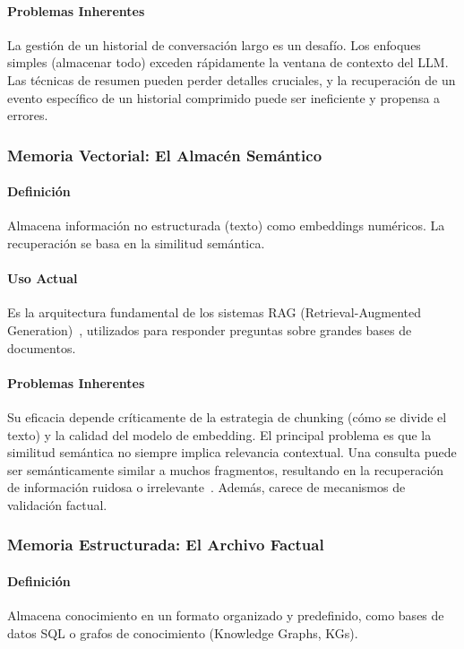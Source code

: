 \documentclass[journal,onecolumn]{IEEEtran}
\begin{document}
\paragraph{Problemas Inherentes} La gestión de un historial de conversación largo es un desafío. Los enfoques simples (almacenar todo) exceden rápidamente la ventana de contexto del LLM. Las técnicas de resumen pueden perder detalles cruciales, y la recuperación de un evento específico de un historial comprimido puede ser ineficiente y propensa a errores.

\subsubsection{Memoria Vectorial: El Almacén Semántico}
\paragraph{Definición} Almacena información no estructurada (texto) como embeddings numéricos. La recuperación se basa en la similitud semántica.

\paragraph{Uso Actual} Es la arquitectura fundamental de los sistemas RAG (Retrieval-Augmented Generation)~\cite{lewis2020retrieval}, utilizados para responder preguntas sobre grandes bases de documentos.

\paragraph{Problemas Inherentes} Su eficacia depende críticamente de la estrategia de chunking (cómo se divide el texto) y la calidad del modelo de embedding. El principal problema es que la similitud semántica no siempre implica relevancia contextual. Una consulta puede ser semánticamente similar a muchos fragmentos, resultando en la recuperación de información ruidosa o irrelevante~\cite{gao2023retrieval}. Además, carece de mecanismos de validación factual.

\subsubsection{Memoria Estructurada: El Archivo Factual}
\paragraph{Definición} Almacena conocimiento en un formato organizado y predefinido, como bases de datos SQL o grafos de conocimiento (Knowledge Graphs, KGs).
\end{document}

